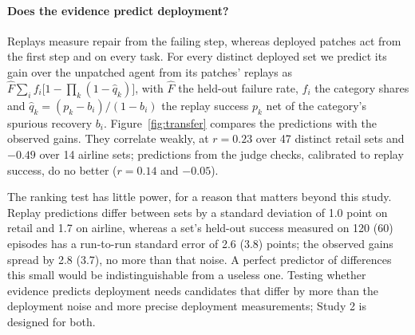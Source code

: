 \documentclass[11pt]{article}
\begin{document}
\begin{table}[t]
\centering
\small
{}
\caption{Held-out success (\%) of the patch set each policy selects with a budget of 10 episodes, mean over five policy seeds. \emph{All}: every held-out episode (retail: 82 of 120 with an injected fault; airline: 35 of 60). \emph{Clean}: episodes without an injected fault (38 and 25). $-$Apply: paired difference from Apply attributed over all episodes, in points, with a task-clustered 90\% interval. \#p: patches deployed; $C$: verification episodes spent.}
\label{tab:deploy}
\end{table}


\paragraph{Does the evidence predict deployment?} Replays measure repair from the failing step, whereas deployed patches act from the first step and on every task. For every distinct deployed set we predict its gain over the unpatched agent from its patches' replays as $\hat F\sum_i f_i\big[1-\prod_k(1-\hat q_k)\big]$, with $\hat F$ the held-out failure rate, $f_i$ the category shares and $\hat q_k=(p_k-b_i)/(1-b_i)$ the replay success $p_k$ net of the category's spurious recovery $b_i$. Figure~\ref{fig:transfer} compares the predictions with the observed gains. They correlate weakly, at $r=0.23$ over 47 distinct retail sets and $-0.49$ over 14 airline sets; predictions from the judge checks, calibrated to replay success, do no better ($r=0.14$ and $-0.05$).

The ranking test has little power, for a reason that matters beyond this study. Replay predictions differ between sets by a standard deviation of 1.0 point on retail and 1.7 on airline, whereas a set's held-out success measured on 120 (60) episodes has a run-to-run standard error of 2.6 (3.8) points; the observed gains spread by 2.8 (3.7), no more than that noise. A perfect predictor of differences this small would be indistinguishable from a useless one. Testing whether evidence predicts deployment needs candidates that differ by more than the deployment noise and more precise deployment measurements; Study 2 is designed for both.
\end{document}
